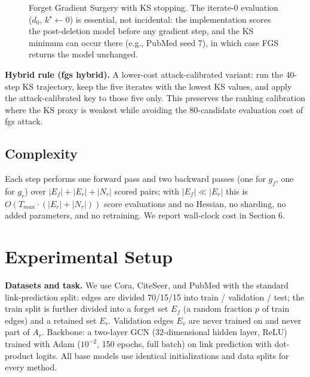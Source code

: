 \documentclass[pdflatex,sn-basic,Numbered]{sn-jnl}
\begin{document}
\begin{figure}[htbp]\centering{}
\caption{Forget Gradient Surgery with KS stopping. The iterate-0 evaluation ($d_0$, $k^\star \leftarrow 0$) is essential, not incidental: the implementation scores the post-deletion model before any gradient step, and the KS minimum can occur there (e.g., PubMed seed 7), in which case FGS returns the model unchanged.}
\end{figure}

\textbf{Hybrid rule (fgs hybrid).} A lower-cost attack-calibrated variant: run the 40-step KS trajectory, keep the five iterates with the lowest KS values, and apply the attack-calibrated key to those five only. This preserves the ranking calibration where the KS proxy is weakest while avoiding the 80-candidate evaluation cost of fgs attack.

\subsection{Complexity}
Each step performs one forward pass and two backward passes (one for $g_f$, one for $g_r$) over $|E_f| + |E_r| + |N_r|$ scored pairs; with $|E_f| \ll |E_r|$ this is $O(T_{max} \cdot (|E_r| + |N_r|))$ score evaluations and no Hessian, no sharding, no added parameters, and no retraining. We report wall-clock cost in Section 6.

\section{Experimental Setup}
\textbf{Datasets and task.} We use Cora, CiteSeer, and PubMed \cite{planetoid2016} with the standard link-prediction split: edges are divided 70/15/15 into train / validation / test; the train split is further divided into a forget set $E_f$ (a random fraction $p$ of train edges) and a retained set $E_r$. Validation edges $E_v$ are never trained on and never part of $A_r$. Backbone: a two-layer GCN (32-dimensional hidden layer, ReLU) trained with Adam ($10^{-2}$, 150 epochs, full batch) on link prediction with dot-product logits. All base models use identical initializations and data splits for every method.
\end{document}
